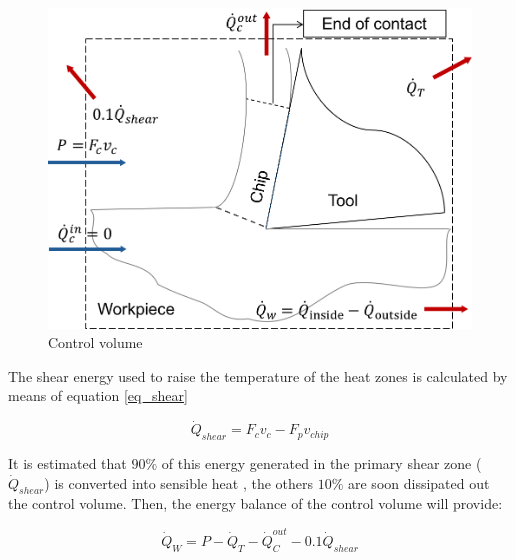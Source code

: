 	\begin{figure}[H]
		\centering
		\captionsetup{justification=centering}
		\includegraphics[scale=0.6]{Imagens/volumeControl.png}
		\caption{Control volume}
		\label{fig:volControl}
	\end{figure}

	The shear energy used to raise the temperature of the heat zones is calculated by means of equation \ref{eq_shear}

	\begin{equation} 
	\label{eq_shear}
	\dot{Q}_{shear} = F_{c}v_{c} - F_{p}v_{chip}
	\end{equation}

	It is estimated that $90\%$ of this energy generated in the primary shear zone ($\dot{Q}_{shear}$) is converted into sensible heat \cite{trigger1942}, the others $10\%$ are soon dissipated out the control volume. Then, the energy balance of the control volume will provide:

	\begin{equation} 
	\label{eq_energybalance}
	\dot{Q}_{W} = P - \dot{Q}_{T} - \dot{Q}_{C}^{out} - 0.1\dot{Q}_{shear}
	\end{equation}
